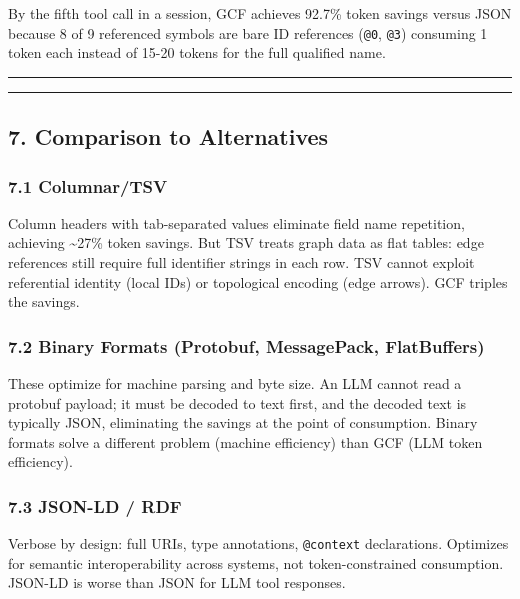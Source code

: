 \documentclass[
  11pt,
  paper=a4,
  ,captions=tableheading
]{scrartcl}
\begin{document}
By the fifth tool call in a session, GCF achieves 92.7\% token savings
versus JSON because 8 of 9 referenced symbols are bare ID references
(\texttt{@0}, \texttt{@3}) consuming 1 token each instead of 15-20
tokens for the full qualified name.

\begin{center}\rule{0.5\linewidth}{0.5pt}\end{center}

\begin{center}\rule{0.5\linewidth}{0.5pt}\end{center}

\subsection{7. Comparison to
Alternatives}\label{comparison-to-alternatives}

\subsubsection{7.1 Columnar/TSV}\label{columnartsv}

Column headers with tab-separated values eliminate field name
repetition, achieving \textasciitilde27\% token savings. But TSV treats
graph data as flat tables: edge references still require full identifier
strings in each row. TSV cannot exploit referential identity (local IDs)
or topological encoding (edge arrows). GCF triples the savings.

\subsubsection{7.2 Binary Formats (Protobuf, MessagePack,
FlatBuffers)}\label{binary-formats-protobuf-messagepack-flatbuffers}

These optimize for machine parsing and byte size. An LLM cannot read a
protobuf payload; it must be decoded to text first, and the decoded text
is typically JSON, eliminating the savings at the point of consumption.
Binary formats solve a different problem (machine efficiency) than GCF
(LLM token efficiency).

\subsubsection{7.3 JSON-LD / RDF}\label{json-ld-rdf}

Verbose by design: full URIs, type annotations, \texttt{@context}
declarations. Optimizes for semantic interoperability across systems,
not token-constrained consumption. JSON-LD is worse than JSON for LLM
tool responses.
\end{document}

